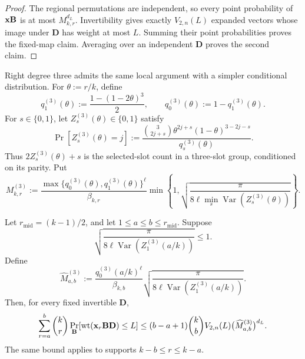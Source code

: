 \begin{proof}
The regional permutations are independent, so every point probability of
$\mathbf x\mathbf B$ is at most $M_{k,r}^{d_L}$.  Invertibility gives exactly
$V_{2,n}(L)$ expanded vectors whose image under $\mathbf D$ has weight at most
$L$.  Summing their point probabilities proves the fixed-map claim.
Averaging over an independent $\mathbf D$ proves the second claim.
\end{proof}

Right degree three admits the same local argument with a simpler conditional
distribution.  For $\theta:=r/k$, define
\begin{equation}
 q^{(3)}_1(\theta):=\frac{1-(1-2\theta)^3}{2},
 \qquad q^{(3)}_0(\theta):=1-q^{(3)}_1(\theta).
 \label{eq:degree-three-parity-probabilities}
\end{equation}
For $s\in\{0,1\}$, let $Z^{(3)}_s(\theta)\in\{0,1\}$ satisfy
\begin{equation}
 \Pr[Z^{(3)}_s(\theta)=j]
 :=\frac{\binom{3}{2j+s}\theta^{2j+s}(1-\theta)^{3-2j-s}}
 {q^{(3)}_s(\theta)}.
 \label{eq:degree-three-conditioned-half-count}
\end{equation}
Thus $2Z^{(3)}_s(\theta)+s$ is the selected-slot count in a three-slot group,
conditioned on its parity.  Put
\begin{equation}
 M^{(3)}_{k,r}:=
 \frac{\max\{q^{(3)}_0(\theta),q^{(3)}_1(\theta)\}^{\ell}}{\beta_{k,r}}
 \min\left\{1,
 \sqrt{\frac{\pi}{8\ell\min_s\operatorname{Var}(Z^{(3)}_s(\theta))}}
 \right\}.
 \label{eq:degree-three-point-mass}
\end{equation}

\begin{lemma}
\label{lem:degree-three-central-block}
Let $r_{\mathrm{mid}}=(k-1)/2$, and let
$1\leq a\leq b\leq r_{\mathrm{mid}}$.  Suppose
\begin{equation*}
 \sqrt{\frac{\pi}
 {8\ell\operatorname{Var}(Z^{(3)}_1(a/k))}}\leq1.
\end{equation*}
Define
\begin{equation}
 \widehat M^{(3)}_{a,b}:=
 \frac{q^{(3)}_0(a/k)^\ell}{\beta_{k,b}}
 \sqrt{\frac{\pi}
 {8\ell\operatorname{Var}(Z^{(3)}_1(a/k))}}.
 \label{eq:degree-three-block-point-mass}
\end{equation}
Then, for every fixed invertible $\mathbf D$,
\begin{equation}
 \sum_{r=a}^{b}\binom{k}{r}
 \Pr_{\mathbf B}[\operatorname{wt}(\mathbf x_r\mathbf B\mathbf D)\leq L]
 \leq(b-a+1)\binom{k}{b}V_{2,n}(L)
 \bigl(\widehat M^{(3)}_{a,b}\bigr)^{d_L}.
 \label{eq:degree-three-central-block}
\end{equation}
The same bound applies to supports $k-b\leq r\leq k-a$.
\end{lemma}

